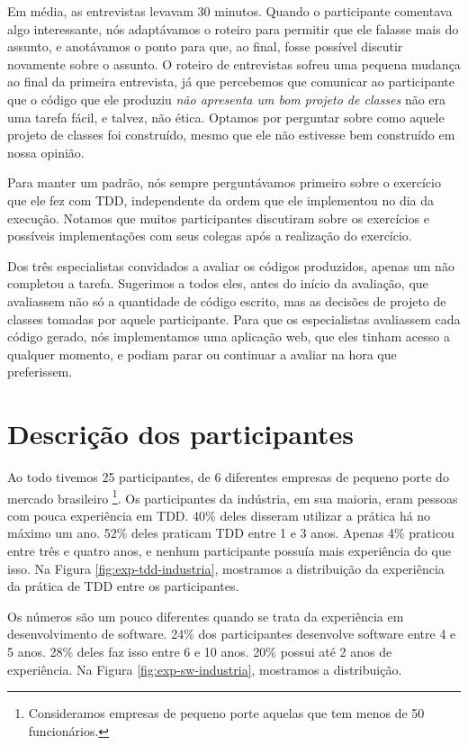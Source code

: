 Em média, as entrevistas levavam 30 minutos. Quando o participante comentava
algo interessante, nós adaptávamos o roteiro para permitir que ele falasse mais
do assunto, e anotávamos o ponto para que, ao final, fosse possível discutir novamente sobre o assunto.
O roteiro de entrevistas sofreu uma pequena mudança ao final da primeira entrevista,
já que percebemos que comunicar ao participante que o código que ele produziu
\textit{não apresenta um bom projeto de classes} não era uma tarefa fácil, e talvez, não ética. 
Optamos por perguntar sobre como aquele projeto de classes foi construído, mesmo que ele
não estivesse bem construído em nossa opinião.

Para manter um padrão, nós sempre perguntávamos primeiro sobre o exercício que ele
fez com TDD, independente da ordem que ele implementou no dia da execução. Notamos
que muitos participantes discutiram sobre os exercícios e possíveis implementações com seus colegas
após a realização do exercício.

Dos três especialistas convidados a avaliar os códigos produzidos, apenas um não
completou a tarefa. Sugerimos a todos eles, antes do início da avaliação, que avaliassem
não só a quantidade de código escrito, mas as decisões de projeto de classes tomadas por aquele
participante. Para que os especialistas avaliassem cada código gerado, nós implementamos
uma aplicação web, que eles tinham acesso a qualquer momento, e podiam parar ou continuar
a avaliar na hora que preferissem.


\section{Descrição dos participantes}
\label{sec:desc-participantes}

Ao todo tivemos 25 participantes, de 6 diferentes empresas de pequeno porte do mercado
brasileiro \footnote{Consideramos empresas de pequeno porte aquelas que tem menos de 50 funcionários.}.
Os participantes da indústria, em sua maioria, eram pessoas com pouca experiência em TDD.
40\% deles disseram utilizar a prática há no máximo um ano. 52\% deles praticam TDD
entre 1 e 3 anos. Apenas 4\% praticou entre três e quatro anos, e nenhum participante
possuía mais experiência do que isso. Na Figura \ref{fig:exp-tdd-industria}, mostramos
a distribuição da experiência da prática de TDD entre os participantes.

Os números são um pouco diferentes quando se trata da experiência em desenvolvimento
de software. 24\% dos participantes desenvolve software entre 4 e 5 anos.
28\% deles faz isso entre 6 e 10 anos. 20\% possui até 2 anos de experiência.
Na Figura \ref{fig:exp-sw-industria}, mostramos a distribuição.



